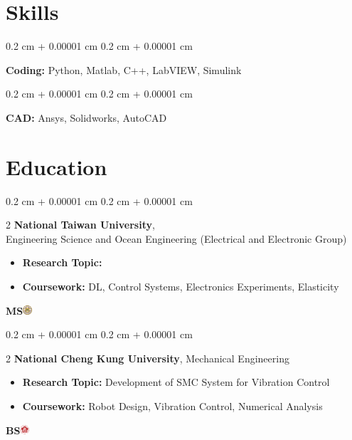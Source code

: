 \documentclass[10pt, letterpaper]{article}
\newenvironment{highlights}{
    \begin{itemize}[
        topsep=0.10 cm,
        parsep=0.10 cm,
        partopsep=0pt,
        itemsep=0pt,
        leftmargin=0.4 cm + 10pt
    ]
}{
    \end{itemize}
} %
\newenvironment{onecolentry}{
    \begin{adjustwidth}{
        0.2 cm + 0.00001 cm
    }{
        0.2 cm + 0.00001 cm
    }
}{
    \end{adjustwidth}
} %
\newenvironment{twocolentry}[2][]{
    \onecolentry
    \def\secondColumn{#2}
    \setcolumnwidth{\fill, 4.5 cm}
    \begin{paracol}{2}
}{
    \switchcolumn \raggedleft \secondColumn
    \end{paracol}
    \endonecolentry
} %
\begin{document}
        \vspace{0.2 cm}

    \section{Skills}

        \begin{onecolentry}
            \textbf{Coding:} Python, Matlab, C++, LabVIEW, Simulink \end{onecolentry}

        \vspace{0.2 cm}

        \begin{onecolentry}
            \textbf{CAD:} Ansys, Solidworks, AutoCAD \end{onecolentry}

    

    \section{Education}
       
        \begin{twocolentry}
        {\textbf{MS}\hspace{0.2cm}\includegraphics[height=0.9em]{fig/icon/NTU.png}}{
        }
            \textbf{National Taiwan University}, \\Engineering Science and Ocean Engineering (Electrical and Electronic Group)
            \begin{highlights}
                \item \textbf{Research Topic:}
                \item \textbf{Coursework:} DL, Control Systems, Electronics Experiments, Elasticity
            \end{highlights}
        \end{twocolentry}

        \begin{twocolentry}
        {\textbf{BS}\hspace{0.2cm}\includegraphics[height=0.9em]{fig/icon/NCKU.png}}{
        }
            \textbf{National Cheng Kung University}, Mechanical Engineering
            \begin{highlights}
                \item \textbf{Research Topic:} Development of SMC System for Vibration Control
                \item \textbf{Coursework:} Robot Design, Vibration Control, Numerical Analysis
            \end{highlights}
        \end{twocolentry}
\end{document}
